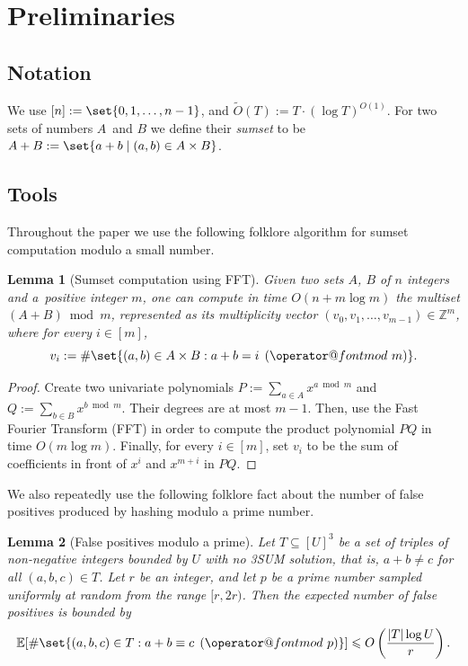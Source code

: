 \documentclass[10pt,a4paper]{article}
\makeatletter
\newtheorem{lemma}{Lemma}[section]
\newcommand{\Ot}{\widetilde{O}}
\newcommand{\E}{\mathbb{E}}
\newcommand{\tpmod}[1]{\mkern 8mu({\operator@font mod}\mkern 6mu#1)}
\makeatother
\begin{document}
\section{Preliminaries}

\subsection{Notation}

We use $[n] := \set{0, 1, \ldots, n-1}$, and $\Ot(T) := T \cdot (\log T)^{O(1)}$. For two sets of numbers $A$~and $B$ we define their \emph{sumset} to be $A + B := \set{a+b \mid (a, b) \in A \times B}$.

\subsection{Tools}
Throughout the paper we use the following folklore algorithm for sumset computation modulo a small number.

\begin{lemma}[Sumset computation using FFT]\label{lem:fft}
Given two sets $A$, $B$ of $n$ integers and a~positive integer $m$, one can compute in time $O(n + m \log m)$ the multiset $(A + B) \bmod m$, represented as its multiplicity vector $(v_0, v_1, \ldots, v_{m-1}) \in \mathbb{Z}^m$, where for every $i \in [m]$,
\[v_i := \#\set{(a, b) \in A \times B : a + b = i \tpmod{m}}.\]
\end{lemma}

\begin{proof}
Create two univariate polynomials $P := \sum_{a \in A}x^{a \bmod m}$ and $Q := \sum_{b \in B}x^{b \bmod m}$. Their degrees are at most $m - 1$. Then, use the Fast Fourier Transform (FFT) in order to compute the product polynomial $PQ$ in time $O(m \log m)$. Finally, for every $i \in [m]$, set $v_i$ to be the sum of coefficients in front of $x^i$ and $x^{m+i}$ in $PQ$.
\end{proof}

We also repeatedly use the following folklore fact about the number of false positives produced by hashing modulo a prime number.

\begin{lemma}[False positives modulo a prime]\label{lem:false}
Let $T \subseteq [U]^3$ be a set of triples of non-negative integers bounded by $U$ with no 3SUM solution, that is, $a + b \neq c$ for all $(a,b,c) \in T$. Let $r$ be an integer, and let $p$ be a prime number sampled uniformly at random from the range $[r, 2r)$. Then the expected number of false positives is bounded by
\[\E[\#\set{(a,b,c) \in T : a + b \equiv c \tpmod{p}}] \leqslant O\left(\frac{|T|\log U}{r}\right).\]
\end{lemma}
\end{document}
